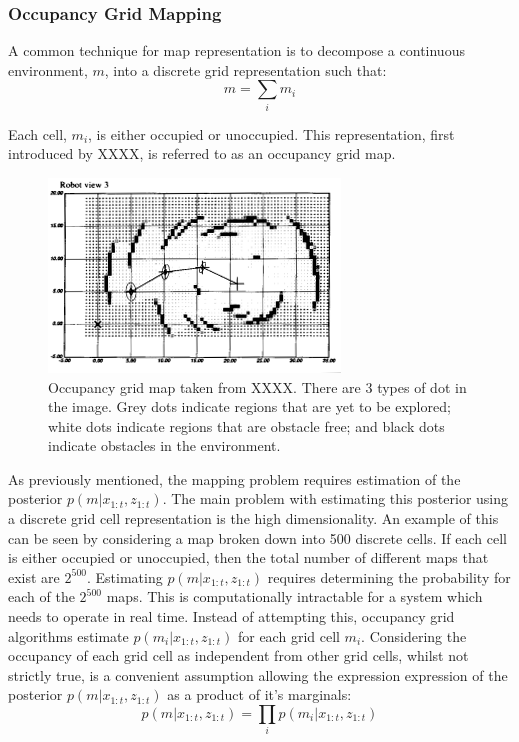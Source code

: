 \documentclass[a4paper]{article}
\begin{document}
\subsubsection{Occupancy Grid Mapping}
A common technique for map representation is to decompose a continuous environment, $m$, into a discrete grid representation such that:
\begin{equation}
m = \sum_{i} m_i
\end{equation}

Each cell, $m_i$, is either occupied or unoccupied. This representation, first introduced by XXXX, is referred to as an occupancy grid map.
\begin{figure}[h]
\centering
\includegraphics[scale=0.8]{occupancy_grid}
\caption{Occupancy grid map taken from XXXX. There are 3 types of dot in the image. Grey dots indicate regions that are yet to be explored; white dots indicate regions that are obstacle free; and black dots indicate obstacles in the environment.}
\end{figure}

As previously mentioned, the mapping problem requires estimation of the posterior $p(m | x_{1:t}, z_{1:t})$. The main problem with estimating this posterior using a discrete grid cell representation is the high dimensionality. An example of this can be seen  by considering a map broken down into 500 discrete cells. If each cell is either occupied or unoccupied, then the total number of different maps that exist are $2^{500}$. Estimating $p(m | x_{1:t}, z_{1:t})$ requires determining the probability for each of the $2^{500}$ maps. This is computationally intractable for a system which needs to operate in real time. Instead of attempting this, occupancy grid algorithms estimate $p(m_i | x_{1:t}, z_{1:t})$ for each grid cell $m_i$. Considering the occupancy of each grid cell as independent from other grid cells, whilst not strictly true, is a convenient assumption allowing the expression expression of the posterior $p(m | x_{1:t}, z_{1:t})$ as a product of it's marginals:
\begin{equation}
p(m | x_{1:t}, z_{1:t}) = \prod_{i} p(m_i | x_{1:t}, z_{1:t})
\end{equation}
\end{document}
